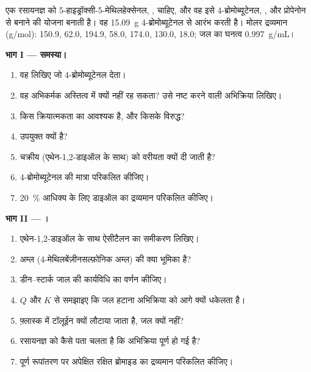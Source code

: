 \begin{problem}
\label{pb:b1:acetals-protection:1}
एक रसायनज्ञ को 5-हाइड्रॉक्सी-5-मेथिलहेक्सेनल, , चाहिए, और
वह इसे 4-ब्रोमोब्यूटेनल, , और प्रोपेनोन से बनाने की योजना बनाती है।
वह \qty{15.09}{g} 4-ब्रोमोब्यूटेनल से आरंभ करती है। मोलर द्रव्यमान
(\unit{g/mol}):  150.9,  62.0,  194.9,
 58.0,  174.0,  130.0,  18.0;
जल का घनत्व \qty{0.997}{g/mL}।

\medskip
\noindent\textbf{भाग I --- समस्या।}
\begin{enumerate}
  \item वह  लिखिए जो 4-ब्रोमोब्यूटेनल देता।
  \item वह अभिकर्मक अस्तित्व में क्यों नहीं रह सकता? उसे नष्ट करने वाली अभिक्रिया
        लिखिए।
  \item किस क्रियात्मकता का  आवश्यक है, और किसके विरुद्ध?
  \item {} उपयुक्त क्यों है?
  \item चक्रीय  (एथेन-1,2-डाइऑल के साथ) को वरीयता क्यों दी जाती है?
  \item 4-ब्रोमोब्यूटेनल की मात्रा परिकलित कीजिए।
  \item \qty{20}{\percent} आधिक्य के लिए डाइऑल का द्रव्यमान परिकलित कीजिए।
\end{enumerate}

\medskip
\noindent\textbf{भाग II --- ।}
\begin{enumerate}[resume]
  \item एथेन-1,2-डाइऑल के साथ ऐसीटैलन का समीकरण लिखिए।
  \item अम्ल  (4-मेथिलबेंज़ीनसल्फ़ोनिक
        अम्ल) की क्या भूमिका है?
  \item डीन--स्टार्क जाल की कार्यविधि का वर्णन कीजिए।
  \item $Q$ और $K$ से समझाइए कि जल हटाना अभिक्रिया को आगे क्यों धकेलता है।
  \item फ़्लास्क में टॉलूईन क्यों लौटाया जाता है, जल क्यों नहीं?
  \item रसायनज्ञ को कैसे पता चलता है कि अभिक्रिया पूर्ण हो गई है?
  \item पूर्ण रूपांतरण पर अपेक्षित रक्षित ब्रोमाइड का द्रव्यमान परिकलित कीजिए।
\end{enumerate}


\end{problem}
